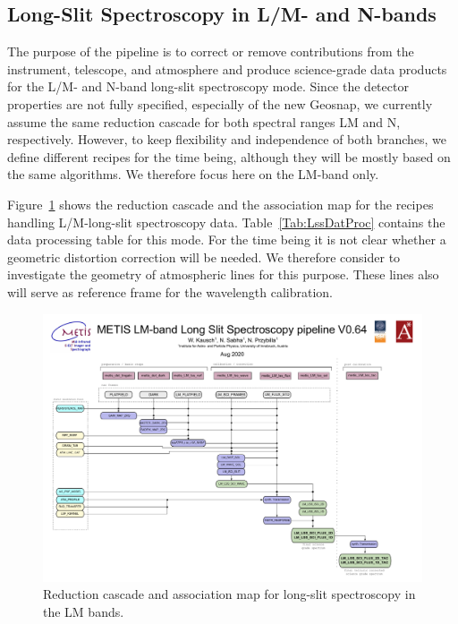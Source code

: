 \subsection{Long-Slit Spectroscopy in L/M- and N-bands}

The purpose of the pipeline is to correct or remove contributions from
the instrument, telescope, and atmosphere and produce science-grade
data products for the L/M- and N-band long-slit spectroscopy
mode. Since the detector properties are not fully specified, especially of the new Geosnap, we currently assume
the same reduction cascade for both spectral ranges LM and
N, respectively. However, to keep flexibility and independence of both branches, we
define different recipes for the time being, although they will be
mostly based on the same algorithms. We therefore focus here on the LM-band only.

Figure~\ref{Fig:LMLssAssomap} shows the reduction cascade and the association map for the recipes handling L/M-long-slit
spectroscopy data.  Table~\ref{Tab:LssDatProc} contains the data processing table for this mode. For the time being it is not clear whether a geometric
distortion correction will be needed. We therefore consider to investigate
the geometry of atmospheric lines for this purpose. These lines also will
serve as reference frame for the wavelength calibration.

\begin{figure}
  \centering
  \includegraphics[width=0.9\textheight]{figures/LM_LSS_pipeline_wf_draft_latest_v0.64.pdf}
  \caption[Reduction cascade and association map for LM long-slit
  spectroscopy]{Reduction cascade and association map for long-slit
    spectroscopy in the LM bands.  }
  \label{Fig:LMLssAssomap}
\end{figure}

